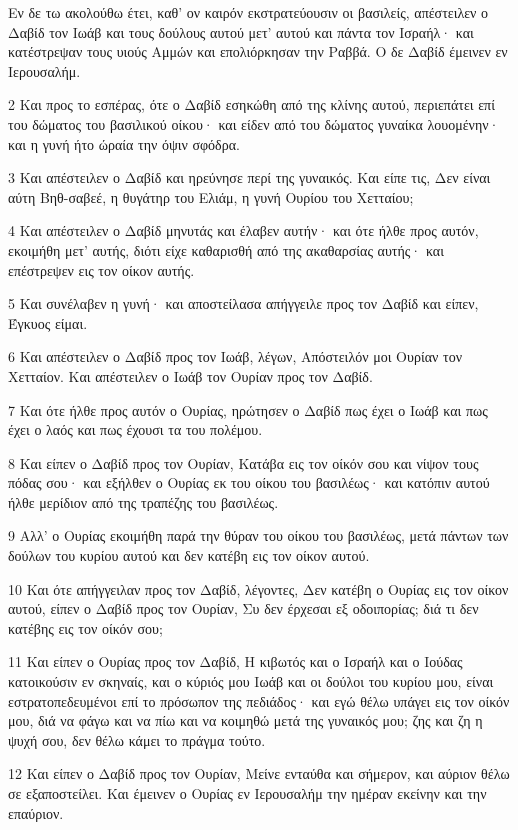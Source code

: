 \par Εν δε τω ακολούθω έτει, καθ' ον καιρόν εκστρατεύουσιν οι βασιλείς, απέστειλεν ο Δαβίδ τον Ιωάβ και τους δούλους αυτού μετ' αυτού και πάντα τον Ισραήλ· και κατέστρεψαν τους υιούς Αμμών και επολιόρκησαν την Ραββά. Ο δε Δαβίδ έμεινεν εν Ιερουσαλήμ.
\par 2 Και προς το εσπέρας, ότε ο Δαβίδ εσηκώθη από της κλίνης αυτού, περιεπάτει επί του δώματος του βασιλικού οίκου· και είδεν από του δώματος γυναίκα λουομένην· και η γυνή ήτο ώραία την όψιν σφόδρα.
\par 3 Και απέστειλεν ο Δαβίδ και ηρεύνησε περί της γυναικός. Και είπε τις, Δεν είναι αύτη Βηθ-σαβεέ, η θυγάτηρ του Ελιάμ, η γυνή Ουρίου του Χετταίου;
\par 4 Και απέστειλεν ο Δαβίδ μηνυτάς και έλαβεν αυτήν· και ότε ήλθε προς αυτόν, εκοιμήθη μετ' αυτής, διότι είχε καθαρισθή από της ακαθαρσίας αυτής· και επέστρεψεν εις τον οίκον αυτής.
\par 5 Και συνέλαβεν η γυνή· και αποστείλασα απήγγειλε προς τον Δαβίδ και είπεν, Έγκυος είμαι.
\par 6 Και απέστειλεν ο Δαβίδ προς τον Ιωάβ, λέγων, Απόστειλόν μοι Ουρίαν τον Χετταίον. Και απέστειλεν ο Ιωάβ τον Ουρίαν προς τον Δαβίδ.
\par 7 Και ότε ήλθε προς αυτόν ο Ουρίας, ηρώτησεν ο Δαβίδ πως έχει ο Ιωάβ και πως έχει ο λαός και πως έχουσι τα του πολέμου.
\par 8 Και είπεν ο Δαβίδ προς τον Ουρίαν, Κατάβα εις τον οίκόν σου και νίψον τους πόδας σου· και εξήλθεν ο Ουρίας εκ του οίκου του βασιλέως· και κατόπιν αυτού ήλθε μερίδιον από της τραπέζης του βασιλέως.
\par 9 Αλλ' ο Ουρίας εκοιμήθη παρά την θύραν του οίκου του βασιλέως, μετά πάντων των δούλων του κυρίου αυτού και δεν κατέβη εις τον οίκον αυτού.
\par 10 Και ότε απήγγειλαν προς τον Δαβίδ, λέγοντες, Δεν κατέβη ο Ουρίας εις τον οίκον αυτού, είπεν ο Δαβίδ προς τον Ουρίαν, Συ δεν έρχεσαι εξ οδοιπορίας; διά τι δεν κατέβης εις τον οίκόν σου;
\par 11 Και είπεν ο Ουρίας προς τον Δαβίδ, Η κιβωτός και ο Ισραήλ και ο Ιούδας κατοικούσιν εν σκηναίς, και ο κύριός μου Ιωάβ και οι δούλοι του κυρίου μου, είναι εστρατοπεδευμένοι επί το πρόσωπον της πεδιάδος· και εγώ θέλω υπάγει εις τον οίκόν μου, διά να φάγω και να πίω και να κοιμηθώ μετά της γυναικός μου; ζης και ζη η ψυχή σου, δεν θέλω κάμει το πράγμα τούτο.
\par 12 Και είπεν ο Δαβίδ προς τον Ουρίαν, Μείνε ενταύθα και σήμερον, και αύριον θέλω σε εξαποστείλει. Και έμεινεν ο Ουρίας εν Ιερουσαλήμ την ημέραν εκείνην και την επαύριον.
